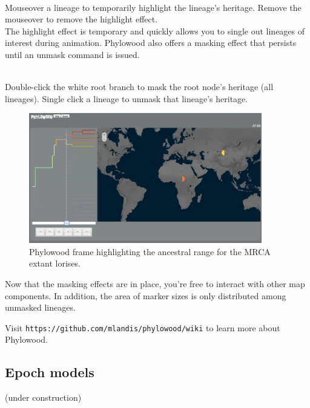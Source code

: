 \noindent \\ \impmark Mouseover a lineage to temporarily highlight the lineage's heritage. Remove the mouseover to remove the highlight effect. \\

The highlight effect is temporary and quickly allows you to single out lineages of interest during animation.
Phylowood also offers a masking effect that persists until an unmask command is issued.

\noindent \\ \impmark Double-click the white root branch to mask the root node's heritage (all lineages). Single click a lineage to unmask that lineage's heritage. \\

\begin{figure}[H]
\centering
\includegraphics[width=4in]{figures/bg_1_loris}
\caption{Phylowood frame highlighting the ancestral range for the MRCA extant lorises.}
\end{figure}

Now that the masking effects are in place, you're free to interact with other map components.
In addition, the area of marker sizes is only distributed among unmasked lineages.

Visit \texttt{https://github.com/mlandis/phylowood/wiki} to learn more about Phylowood.

\subsection{Epoch models}

(under construction)

